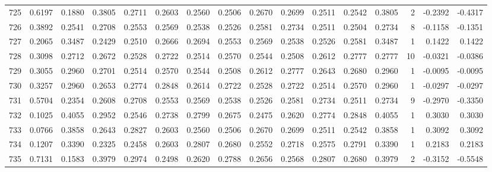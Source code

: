 \begin{tabular}{lrrrrrrrrrrrrrrr}
725 &      0.6197 &  0.1880 &  0.3805 &  0.2711 &  0.2603 &  0.2560 &  0.2506 &  0.2670 &  0.2699 &  0.2511 &   0.2542 &     0.3805 &      2 &                   -0.2392 &                    -0.4317 \\
726 &      0.3892 &  0.2541 &  0.2708 &  0.2553 &  0.2569 &  0.2538 &  0.2526 &  0.2581 &  0.2734 &  0.2511 &   0.2504 &     0.2734 &      8 &                   -0.1158 &                    -0.1351 \\
727 &      0.2065 &  0.3487 &  0.2429 &  0.2510 &  0.2666 &  0.2694 &  0.2553 &  0.2569 &  0.2538 &  0.2526 &   0.2581 &     0.3487 &      1 &                    0.1422 &                     0.1422 \\
728 &      0.3098 &  0.2712 &  0.2672 &  0.2528 &  0.2722 &  0.2514 &  0.2570 &  0.2544 &  0.2508 &  0.2612 &   0.2777 &     0.2777 &     10 &                   -0.0321 &                    -0.0386 \\
729 &      0.3055 &  0.2960 &  0.2701 &  0.2514 &  0.2570 &  0.2544 &  0.2508 &  0.2612 &  0.2777 &  0.2643 &   0.2680 &     0.2960 &      1 &                   -0.0095 &                    -0.0095 \\
730 &      0.3257 &  0.2960 &  0.2653 &  0.2774 &  0.2848 &  0.2614 &  0.2722 &  0.2528 &  0.2722 &  0.2514 &   0.2570 &     0.2960 &      1 &                   -0.0297 &                    -0.0297 \\
731 &      0.5704 &  0.2354 &  0.2608 &  0.2708 &  0.2553 &  0.2569 &  0.2538 &  0.2526 &  0.2581 &  0.2734 &   0.2511 &     0.2734 &      9 &                   -0.2970 &                    -0.3350 \\
732 &      0.1025 &  0.4055 &  0.2952 &  0.2546 &  0.2738 &  0.2799 &  0.2675 &  0.2475 &  0.2620 &  0.2774 &   0.2848 &     0.4055 &      1 &                    0.3030 &                     0.3030 \\
733 &      0.0766 &  0.3858 &  0.2643 &  0.2827 &  0.2603 &  0.2560 &  0.2506 &  0.2670 &  0.2699 &  0.2511 &   0.2542 &     0.3858 &      1 &                    0.3092 &                     0.3092 \\
734 &      0.1207 &  0.3390 &  0.2325 &  0.2458 &  0.2603 &  0.2807 &  0.2680 &  0.2552 &  0.2718 &  0.2575 &   0.2791 &     0.3390 &      1 &                    0.2183 &                     0.2183 \\
735 &      0.7131 &  0.1583 &  0.3979 &  0.2974 &  0.2498 &  0.2620 &  0.2788 &  0.2656 &  0.2568 &  0.2807 &   0.2680 &     0.3979 &      2 &                   -0.3152 &                    -0.5548 \\

\end{tabular}
